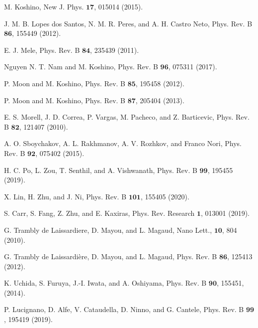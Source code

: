 \documentclass[showpacs,aps,prb,reprint,twocolumn]{revtex4-1}
\begin{document}
\begin{thebibliography}{99}


 M. Koshino, New J. Phys. $\mathbf{17}$, 015014 (2015).

 J. M. B. Lopes dos Santos, N. M. R. Peres, and A. H. Castro Neto, Phys. Rev. B $\mathbf{86}$, 155449 (2012). 

 E. J. Mele, Phys. Rev. B $\mathbf{84}$, 235439 (2011).

 Nguyen N. T. Nam and M. Koshino, Phys. Rev. B $\mathbf{96}$, 075311 (2017).

 P. Moon and M. Koshino, Phys. Rev. B $\mathbf{85}$, 195458 (2012). 

 P. Moon and M. Koshino, Phys. Rev. B $\mathbf{87}$, 205404 (2013).

 E. S. Morell, J. D. Correa, P. Vargas, M. Pacheco, and Z. Barticevic, Phys. Rev. B $\mathbf{82}$, 121407 (2010). 

 A. O. Sboychakov, A. L. Rakhmanov, A. V. Rozhkov, and Franco Nori, Phys. Rev. B $\mathbf{92}$, 075402 (2015).

 H. C. Po, L. Zou, T. Senthil, and A. Vishwanath, Phys. Rev. B $\mathbf{99}$, 195455 (2019). 

 X. Lin, H. Zhu, and J. Ni,
Phys. Rev. B $\mathbf{101}$, 155405 (2020). 

 S. Carr, S. Fang, Z. Zhu, and E. Kaxiras, Phys. Rev. Research $\mathbf{1}$, 013001 (2019). 

 G. Trambly de Laissardiere, D. Mayou, and L. Magaud, Nano Lett., $\mathbf{10}$, 804 (2010). 

 G. Trambly de Laissardière, D. Mayou, and L. Magaud, Phys. Rev. B $\mathbf{86}$, 125413 (2012).

 K. Uchida, S. Furuya, J.-I. Iwata, and A. Oshiyama, Phys. Rev. B $\mathbf{90}$, 155451, (2014). 

 P. Lucignano, D. Alfe, V. Cataudella, D. Ninno, and G. Cantele, Phys. Rev. B $\mathbf{99}$, 195419 (2019).


\end{thebibliography}
\end{document}
